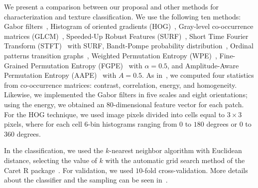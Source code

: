 \documentclass[journal]{IEEEtran}
\begin{document}
We present a comparison between our proposal and other methods for characterization and texture classification.
We use the following ten methods: 
Gabor filters~\cite{weldon1996efficient},  
Histogram of oriented gradients (HOG)~\cite{dalal2005histograms},
Gray-level co-occurrence matrices (GLCM)~\cite{kourgli2012texture}, 
Speeded-Up Robust Features (SURF)~\cite{bay2006surf},
Short Time Fourier Transform (STFT)~\cite{portnoff1980time} with SURF,
Bandt-Pompe probability distribution~\cite{Bandt2002Permutation}, 
Ordinal patterns transition graphs~\cite{Borges2019Transition},
Weighted Permutation Entropy (WPE)~\cite{Fadlallah2013Weightedpermutation},
Fine-Grained Permutation Entropy (FGPE)~\cite{xiao2009fine} with $\alpha = 0.5$, and
Amplitude-Aware Permutation Entropy (AAPE)~\cite{azami2016amplitude} with $A = 0.5$.
As in~\cite{guan2019covariance}, 
we computed four statistics from co-occurrence matrices: contrast, correlation, energy, and homogeneity.
Likewise, we implemented the Gabor filters in five scales and eight orientations; using the energy, we obtained an $80$-dimensional feature vector for each patch.
For the HOG technique, we used image pixels divided into cells equal to $3 \times 3$ pixels, where for each cell 6-bin histograms ranging from $0$ to $180$ degrees or $0$ to $360$ degrees.

In the classification, we used the $k$-nearest neighbor algorithm with Euclidean distance, selecting the value of $k$ with the automatic grid search method of the Caret R package~\cite{kuhn2008building}.
For validation, we used $10$-fold cross-validation.
More details about the classifier and the sampling can be seen in~\cite{mitchell1997machine}.
\end{document}
